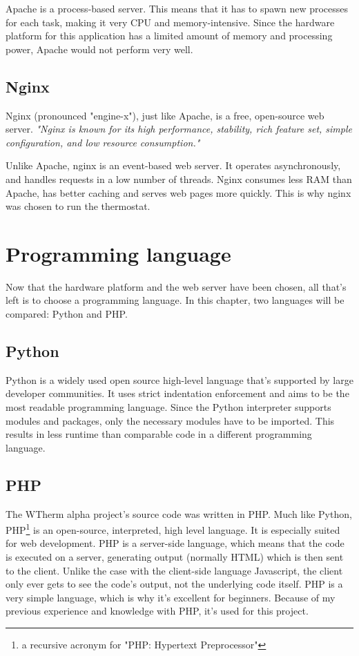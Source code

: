 \documentclass[12pt,a4paper,final]{report}
\begin{document}
Apache is a process-based server. This means that it has to spawn new processes for each task, making it very CPU and memory-intensive. Since the hardware platform for this application has a limited amount of memory and processing power, Apache would not perform very well\cite{WikiVSApacheNginx}.
\section*{Nginx}
Nginx (pronounced "engine-x"), just like Apache, is a free, open-source web server. \textit{"Nginx is known for its high performance, stability, rich feature set, simple configuration, and low resource consumption."}\cite{nginxWiki}

Unlike Apache, nginx is an event-based web server. It operates asynchronously, and handles requests in a low number of threads. Nginx consumes less RAM than Apache, has better caching and serves web pages more quickly\cite{WikiVSApacheNginx}. This is why nginx was chosen to run the thermostat.

\chapter{Programming language}
Now that the hardware platform and the web server have been chosen, all that's left is to choose a programming language. In this chapter, two languages will be compared: Python and PHP.
\section*{Python}
Python is a widely used open source high-level language that's supported by large developer communities. It uses strict indentation enforcement and aims to be the most readable programming language. Since the Python interpreter supports modules and packages, only the necessary modules have to be imported. This results in less runtime than comparable code in a different programming language.\cite{WhatIsPython}

\section*{PHP}
The WTherm alpha project's source code was written in PHP. Much like Python, PHP\footnote{a recursive acronym for "PHP: Hypertext Preprocessor"} is an open-source, interpreted, high level language. It is especially suited for web development. PHP is a server-side language, which means that the code is executed on a server, generating output (normally HTML) which is then sent to the client. Unlike the case with the client-side language Javascript, the client only ever gets to see the code's output, not the underlying code itself. PHP is a very simple language, which is why it's excellent for beginners\cite{PHPintro}. Because of my previous experience and knowledge with PHP, it's used for this project.
\end{document}
